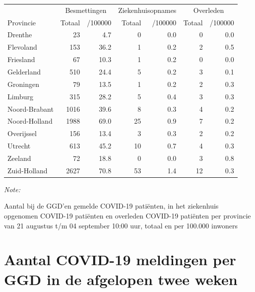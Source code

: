 \documentclass[
  english,
  man,floatsintext]{apa6}
\begin{document}
\begin{table}[H]
\centering
\begin{threeparttable}
\begin{tabular}{lrrrrrr}
\toprule
\multicolumn{1}{c}{ } & \multicolumn{2}{c}{Besmettingen} & \multicolumn{2}{c}{Ziekenhuisopnames} & \multicolumn{2}{c}{Overleden} \\
\cmidrule(l{3pt}r{3pt}){2-3} \cmidrule(l{3pt}r{3pt}){4-5} \cmidrule(l{3pt}r{3pt}){6-7}
Provincie & Totaal & /100000 & Totaal & /100000 & Totaal & /100000\\
\midrule
Drenthe & 23 & 4.7 & 0 & 0.0 & 0 & 0.0\\
Flevoland & 153 & 36.2 & 1 & 0.2 & 2 & 0.5\\
Friesland & 67 & 10.3 & 1 & 0.2 & 0 & 0.0\\
Gelderland & 510 & 24.4 & 5 & 0.2 & 3 & 0.1\\
Groningen & 79 & 13.5 & 1 & 0.2 & 2 & 0.3\\
Limburg & 315 & 28.2 & 5 & 0.4 & 3 & 0.3\\
Noord-Brabant & 1016 & 39.6 & 8 & 0.3 & 4 & 0.2\\
Noord-Holland & 1988 & 69.0 & 25 & 0.9 & 7 & 0.2\\
Overijssel & 156 & 13.4 & 3 & 0.3 & 2 & 0.2\\
Utrecht & 613 & 45.2 & 10 & 0.7 & 4 & 0.3\\
Zeeland & 72 & 18.8 & 0 & 0.0 & 3 & 0.8\\
Zuid-Holland & 2627 & 70.8 & 53 & 1.4 & 12 & 0.3\\
\bottomrule
\end{tabular}
\begin{tablenotes}
\item \textit{Note: } 
\item Aantal bij de GGD’en gemelde COVID-19 patiënten, in het ziekenhuis opgenomen COVID-19 patiënten en overleden COVID-19 patiënten per provincie van 21 augustus t/m 04 september 10:00 uur, totaal en per 100.000 inwoners
\end{tablenotes}
\end{threeparttable}
\end{table}

\newpage

\hypertarget{aantal-covid-19-meldingen-per-ggd-in-de-afgelopen-twee-weken}{%
\section{Aantal COVID-19 meldingen per GGD in de afgelopen twee weken}\label{aantal-covid-19-meldingen-per-ggd-in-de-afgelopen-twee-weken}}
\end{document}
